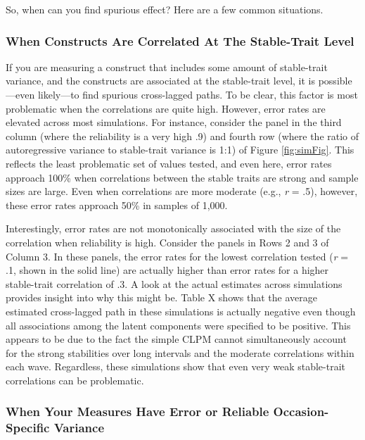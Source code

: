 \documentclass[
  english,
  man,floatsintext]{apa6}
\begin{document}
So, when can you find spurious effect? Here are a few common situations.

\hypertarget{when-constructs-are-correlated-at-the-stable-trait-level}{%
\subsubsection{When Constructs Are Correlated At The Stable-Trait Level}\label{when-constructs-are-correlated-at-the-stable-trait-level}}

If you are measuring a construct that includes some amount of stable-trait variance, and the constructs are associated at the stable-trait level, it is possible---even likely---to find spurious cross-lagged paths. To be clear, this factor is most problematic when the correlations are quite high. However, error rates are elevated across most simulations. For instance, consider the panel in the third column (where the reliability is a very high .9) and fourth row (where the ratio of autoregressive variance to stable-trait variance is 1:1) of Figure \ref{fig:simFig}. This reflects the least problematic set of values tested, and even here, error rates approach 100\% when correlations between the stable traits are strong and sample sizes are large. Even when correlations are more moderate (e.g., \emph{r} = .5), however, these error rates approach 50\% in samples of 1,000.

Interestingly, error rates are not monotonically associated with the size of the correlation when reliability is high. Consider the panels in Rows 2 and 3 of Column 3. In these panels, the error rates for the lowest correlation tested (\emph{r} = .1, shown in the solid line) are actually higher than error rates for a higher stable-trait correlation of .3. A look at the actual estimates across simulations provides insight into why this might be. Table X shows that the average estimated cross-lagged path in these simulations is actually negative even though all associations among the latent components were specified to be positive. This appears to be due to the fact the simple CLPM cannot simultaneously account for the strong stabilities over long intervals and the moderate correlations within each wave. Regardless, these simulations show that even very weak stable-trait correlations can be problematic.

\hypertarget{when-your-measures-have-error-or-reliable-occasion-specific-variance}{%
\subsubsection{When Your Measures Have Error or Reliable Occasion-Specific Variance}\label{when-your-measures-have-error-or-reliable-occasion-specific-variance}}
\end{document}
